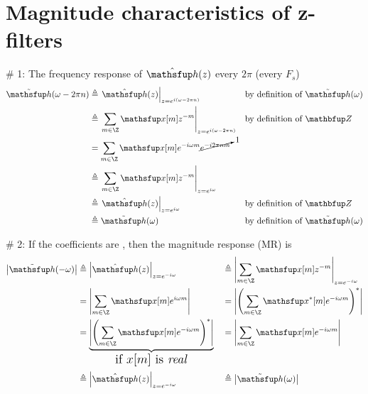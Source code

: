 
\chapter{Magnitude characteristics of z-filters}
\newpage\vfill
\# 1: The frequency response of $\Zh(z)$  every $2\pi$ (every $F_s$)
\vfill
\begin{align*}
  \Fh(\omega-2\pi n)
    &\eqd \brlr{\Zh(z)}_{z=e^{i(\omega-2\pi n)}}
    && \text{by definition of $\Fh(\omega)$}
  \\&\eqd \brlr{\sum_{m\in\Z} \fx[m] z^{-m}}_{z=e^{i(\omega-2\pi n)}}
    &&\text{by definition of $\opZ$}
  \\&= \sum_{m\in\Z} \fx[m] e^{-i\omega m}\cancelto{1}{e^{-i2\pi nm}}
  \\&\eqd \brlr{\sum_{m\in\Z} \fx[m] z^{-m}}_{z=e^{i\omega}}
  \\&\eqd \brlr{\Zh(z)}_{z=e^{i\omega}}
    &&\text{by definition of $\opZ$}
  \\&\eqd \Fh(\omega)
    && \text{by definition of $\Fh(\omega)$}
\end{align*}
\vfill\mbox{}

\newpage
\# 2: If the coefficients are , then the magnitude response (MR) is 
\begin{align*}
  \abs{\Fh(-\omega)}
    &\eqd \abs{\Zh(z)}_{z=e^{-i\omega}}
   &&\eqd \abs{\sum_{m\in\Z} \fx[m] z^{-m}}_{z=e^{-i\omega}}
  \\&= \abs{\sum_{m\in\Z} \fx[m] e^{i\omega m}}
   &&= \abs{\brp{\sum_{m\in\Z} \fx^\ast[m] e^{-i\omega m}}^\ast}
  \\&= \mcom{\abs{\brp{\sum_{m\in\Z} \fx[m] e^{-i\omega m}}^\ast}}
            {\Large if $x[m]$ is \prope{real}}
   &&= \abs{\sum_{m\in\Z} \fx[m] e^{-i\omega m}}
  \\&\eqd \abs{\Zh(z)}_{z=e^{-i\omega}}
   &&\eqd \abs{\Fh(\omega)}
\end{align*}
\vfill\mbox{}

